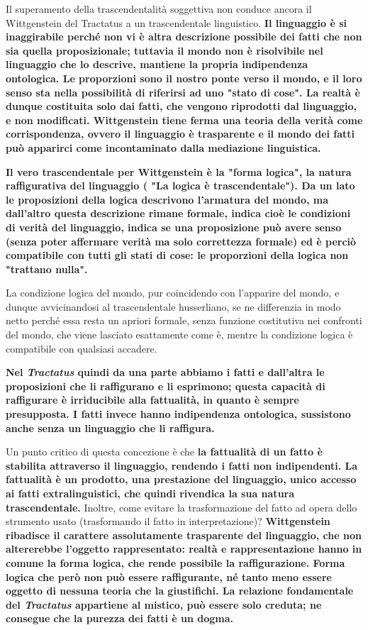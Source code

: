 Il superamento della trascendentalità
soggettiva non conduce ancora il Wittgenstein
del Tractatus a un trascendentale linguistico.
\textbf{Il linguaggio è si inaggirabile perché non vi
è altra descrizione possibile dei fatti che
non sia quella proposizionale; tuttavia il
mondo non è risolvibile nel linguaggio che
lo descrive, mantiene la propria indipendenza
ontologica. Le proporzioni sono il nostro
ponte verso il mondo, e il loro senso
sta nella possibilità di riferirsi ad uno
"stato di cose". La realtà è dunque
costituita solo dai fatti, che vengono riprodotti
dal linguaggio, e non modificati.
Wittgenstein tiene ferma una teoria della
verità come corrispondenza, ovvero il
linguaggio è trasparente e il mondo dei
fatti può apparirci come incontaminato
dalla mediazione linguistica.}

\textbf{Il vero trascendentale per Wittgenstein è
la "forma logica", la natura raffigurativa
del linguaggio ( "La logica è trascendentale").
Da un lato le proposizioni della logica
descrivono l'armatura del mondo, ma dall'altro questa descrizione rimane formale,
indica cioè le condizioni di verità del
linguaggio, indica se una proposizione può avere senso (senza poter affermare verità ma solo correttezza formale) ed è perciò compatibile con
tutti gli stati di cose: le proporzioni
della logica non "trattano nulla".}

La condizione logica del mondo, pur
coincidendo con l'apparire del mondo, e dunque avvicinandosi al trascendentale
husserliano, se ne differenzia in modo
netto perché essa resta un apriori formale,
senza funzione costitutiva nei confronti
del mondo, che viene lasciato esattamente
come è, mentre la condizione logica è
compatibile con qualsiasi accadere.

\textbf{Nel \textit{Tractatus} quindi da una parte abbiamo i fatti e dall'altra le proposizioni che li raffigurano e li esprimono; questa capacità di raffigurare è irriducibile alla fattualità, in quanto è sempre presupposta. I fatti invece hanno indipendenza ontologica, sussistono anche senza un linguaggio che li raffigura.}

Un punto critico di questa concezione è che \textbf{la fattualità di un fatto è stabilita attraverso il linguaggio, rendendo i fatti non indipendenti. La fattualità è un prodotto, una prestazione del linguaggio, unico accesso ai fatti extralinguistici, che quindi rivendica la sua natura trascendentale. }
Inoltre, come evitare la trasformazione del fatto ad opera dello strumento usato (trasformando il fatto in interpretazione)?
\textbf{Wittgenstein ribadisce il carattere assolutamente trasparente del linguaggio, che non altererebbe l'oggetto rappresentato: realtà e rappresentazione hanno in comune la forma logica, che rende possibile la raffigurazione. Forma logica che però non può essere raffigurante, né tanto meno essere oggetto di nessuna teoria che la giustifichi. La relazione fondamentale del \textit{Tractatus} appartiene al mistico, può essere solo creduta; ne consegue che la purezza dei fatti è un dogma.}

